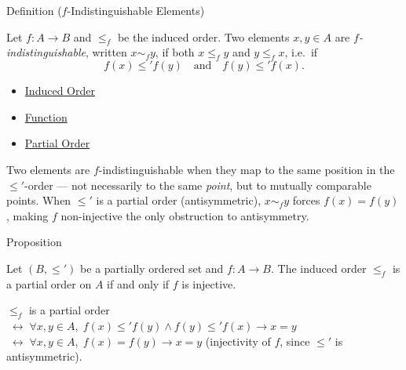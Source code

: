 
\begin{definitionbox}{Definition ($f$-Indistinguishable Elements)}
\begin{definition}\label{def:f-indist}
Let $f : A \to B$ and $\leq_f$ be the induced order. Two elements
$x, y \in A$ are \emph{$f$-indistinguishable}, written $x \sim_f y$,
if both $x \leq_f y$ and $y \leq_f x$, i.e.\ if
\[
f(x) \leq' f(y) \quad \text{and} \quad f(y) \leq' f(x).
\]
\end{definition}
\end{definitionbox}

\begin{dependencies}
\begin{itemize}
  \item \hyperref[def:induced-order]{Induced Order}
  \item \hyperref[def:function]{Function}
  \item \hyperref[def:partial-order]{Partial Order}
\end{itemize}
\end{dependencies}

\begin{remark*}[Intuition]
Two elements are $f$-indistinguishable when they map to the same position
in the $\leq'$-order --- not necessarily to the same \emph{point}, but to
mutually comparable points. When $\leq'$ is a partial order (antisymmetric),
$x \sim_f y$ forces $f(x) = f(y)$, making $f$ non-injective the only
obstruction to antisymmetry.
\end{remark*}

\begin{propositionbox}{Proposition}
\begin{proposition}\label{prop:induced-poset}
Let $(B, \leq')$ be a partially ordered set and $f : A \to B$.
The induced order $\leq_f$ is a partial order on $A$ if and only if
$f$ is injective.
\end{proposition}
\end{propositionbox}

\begin{remark*}
$\leq_f$ is a partial order $\;\leftrightarrow\; \forall x,y \in A,\; f(x)\leq' f(y) \wedge f(y)\leq' f(x) \to x=y$ $\;\leftrightarrow\; \forall x,y \in A,\; f(x)=f(y) \to x=y$ (injectivity of $f$, since $\leq'$ is antisymmetric).
\end{remark*}

